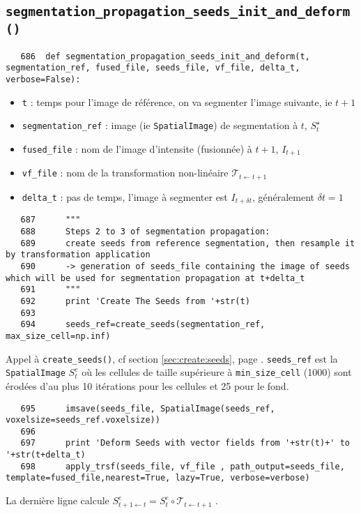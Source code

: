 \documentclass{article}
\def \mycolor {red}
\begin{document}
\subsection{\texttt{segmentation\_propagation\_seeds\_init\_and\_deform()}}
\label{sec:segmentation:propagation:seeds:init:and:deform}
\begin{verbatim}
   686	def segmentation_propagation_seeds_init_and_deform(t, segmentation_ref, fused_file, seeds_file, vf_file, delta_t, verbose=False):
\end{verbatim}
\color{\mycolor}
\begin{itemize}
\itemsep -1ex
\item \verb|t| : temps pour l'image de r\'ef\'erence, on va segmenter l'image suivante, ie $t+1$
\item \verb|segmentation_ref| : image (ie \texttt{SpatialImage}) de segmentation \`a $t$, $S^{\star}_t$
\item \verb|fused_file| : nom de l'image d'intensite (fusionn\'ee) \`a $t+1$, $I_{t+1}$
\item \verb|vf_file| : nom de la  transformation non-lin\'eaire $\mathcal{T}_{t \leftarrow t+1}$
\item \verb|delta_t| : pas de temps, l'image \`a segmenter est $I_{t+\delta t}$, g\'en\'eralement $\delta t = 1$
\end{itemize}
\color{black}
\begin{verbatim}  
   687	    """
   688	    Steps 2 to 3 of segmentation propagation:
   689	    create seeds from reference segmentation, then resample it by transformation application
   690	    -> generation of seeds_file containing the image of seeds which will be used for segmentation propagation at t+delta_t
   691	    """
   692	    print 'Create The Seeds from '+str(t)
   693	
   694	    seeds_ref=create_seeds(segmentation_ref, max_size_cell=np.inf)
\end{verbatim} 
\color{\mycolor}
Appel \`a \texttt{create\_seeds()}, cf section \ref{sec:create:seeds}, page \pageref{sec:create:seeds}.
\verb|seeds_ref| est la \texttt{SpatialImage} $S^e_t$ \cite[section 2.3.3.4]{guignard:tel-01278725} o\`u les cellules de taille sup\'erieure \`a \verb|min_size_cell| (1000) sont \'erod\'ees d'au plus 10 it\'erations pour les cellules et 25 pour le fond.
\color{black}
\begin{verbatim}  
   695	    imsave(seeds_file, SpatialImage(seeds_ref, voxelsize=seeds_ref.voxelsize))
   696	    
   697	    print 'Deform Seeds with vector fields from '+str(t)+' to '+str(t+delta_t)
   698	    apply_trsf(seeds_file, vf_file , path_output=seeds_file, template=fused_file,nearest=True, lazy=True, verbose=verbose)
\end{verbatim}
\color{\mycolor}
La derni\`ere ligne calcule $S^e_{t+1 \leftarrow t} = S^e_t \circ \mathcal{T}_{t \leftarrow t+1} $ \cite[section 2.3.3.4]{guignard:tel-01278725}.
\color{black}
\end{document}
